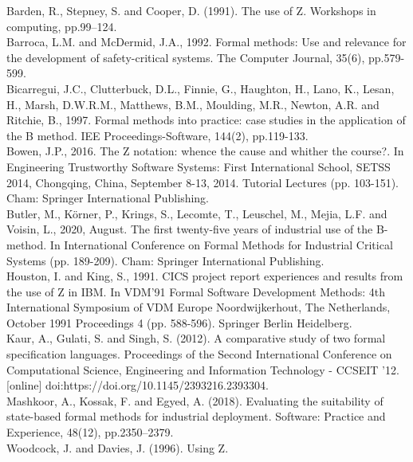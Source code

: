 \documentclass{article}
\begin{document}
Barden, R., Stepney, S. and Cooper, D. (1991). The use of Z. Workshops in computing, pp.99–124. \\
\newline
Barroca, L.M. and McDermid, J.A., 1992. Formal methods: Use and relevance for the development of safety-critical systems. The Computer Journal, 35(6), pp.579-599. \\
\newline
Bicarregui, J.C., Clutterbuck, D.L., Finnie, G., Haughton, H., Lano, K., Lesan, H., Marsh, D.W.R.M., Matthews, B.M., Moulding, M.R., Newton, A.R. and Ritchie, B., 1997. Formal methods into practice: case studies in the application of the B method. IEE Proceedings-Software, 144(2), pp.119-133. \\
\newline
Bowen, J.P., 2016. The Z notation: whence the cause and whither the course?. In Engineering Trustworthy Software Systems: First International School, SETSS 2014, Chongqing, China, September 8-13, 2014. Tutorial Lectures (pp. 103-151). Cham: Springer International Publishing. \\
\newline
Butler, M., Körner, P., Krings, S., Lecomte, T., Leuschel, M., Mejia, L.F. and Voisin, L., 2020, August. The first twenty-five years of industrial use of the B-method. In International Conference on Formal Methods for Industrial Critical Systems (pp. 189-209). Cham: Springer International Publishing. \\
\newline
Houston, I. and King, S., 1991. CICS project report experiences and results from the use of Z in IBM. In VDM'91 Formal Software Development Methods: 4th International Symposium of VDM Europe Noordwijkerhout, The Netherlands, October 1991 Proceedings 4 (pp. 588-596). Springer Berlin Heidelberg. \\
\newline
Kaur, A., Gulati, S. and Singh, S. (2012). A comparative study of two formal specification languages. Proceedings of the Second International Conference on Computational Science, Engineering and Information Technology - CCSEIT ’12. [online] doi:https://doi.org/10.1145/2393216.2393304. \\
\newline
Mashkoor, A., Kossak, F. and Egyed, A. (2018). Evaluating the suitability of state-based formal methods for industrial deployment. Software: Practice and Experience, 48(12), pp.2350–2379. \\
\newline
Woodcock, J. and Davies, J. (1996). Using Z. \\
\end{document}
